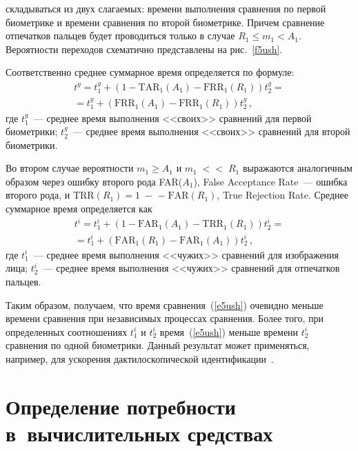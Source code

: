 \begin{multicols}{2}


\noindent
складываться из 
двух слагаемых: времени выполнения сравнения по первой биометрике и времени
сравнения по второй биометрике. Причем сравнение отпечатков пальцев будет 
проводиться только в случае $R_1\leq m_1 <A_1$. Вероятности переходов схематично 
представлены на рис.~\ref{f5ush}. 

   
Соответственно среднее суммарное время определяется по формуле:
     \begin{multline}
     t^g = t_1^g + (1-\mathrm{TAR}_1(A_1)-\mathrm{FRR}_1(R_1))t_2^g ={}\\
     {}= t_1^g 
+(\mathrm{FRR}_1(A_1)-\mathrm{FRR}_1(R_1))t_2^g\,,
     \label{e4ush}
     \end{multline}
где $t_1^g$~--- среднее время выполнения <<своих>> сравнений для первой биометрики; 
$t_2^g$~---  среднее время выполнения <<своих>> сравнений для второй био\-мет\-рики.

     Во втором случае вероятности $m_1\geq A_1$ и $m_1\;<$\linebreak $<\;R_1$ выражаются 
аналогичным образом \mbox{через} ошибку второго рода FAR($A_1$), False Acceptance 
     Rate~--- ошибка второго рода, и $\mathrm{TRR}(R_1)=1\;-$\linebreak
     $-\;\mathrm{FAR}(R_1)$, True Rejection 
Rate. Среднее суммарное время определяется как
     \begin{multline}
     t^i = t_1^i +(1 - \mathrm{FAR}_1(A_1) -\mathrm{TRR}_1(R_1)) t^i_2 = {}\\
     {}=
t_1^i+(\mathrm{FAR}_1(R_1) -\mathrm{FAR}_1(A_1))t_2^i\,,
     \label{e5ush}
     \end{multline}
где $t_1^i$~--- среднее время выполнения <<чужих>> сравнений для изображения 
лица; $t_2^i$~--- среднее время выполнения <<чужих>> сравнений для отпечатков 
пальцев.
     
     Таким образом, получаем, что время сравнения~(\ref{e5ush}) очевидно меньше 
времени сравнения при независимых процессах сравнения. Более того, при 
определенных соотношениях $t_1^i$ и $t_2^i$ время~(\ref{e5ush}) меньше времени 
$t_2^i$ сравнения по одной биометрики. Данный результат может применяться, 
например, для ускорения дактилоскопической идентификации~\cite{2ush}. 
    
     \section{Определение потребности в~вычислительных средствах}
     

\end{multicols}
